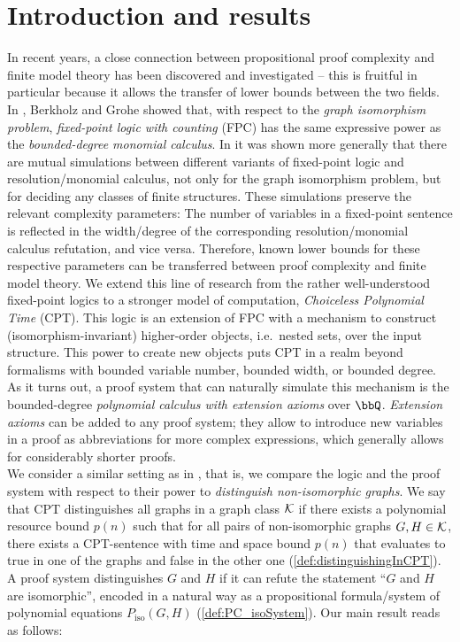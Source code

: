 \documentclass[a4paper,UKenglish,cleveref, autoref, thm-restate]{lipics-v2021}
\newcommand{\Kk}{{\cal K}}
\newcommand{\Piso}{P_{\text{iso}}}
\begin{document}
	\section{Introduction and results}
	In recent years, a close connection between propositional proof complexity and finite model theory has been discovered and investigated -- this is fruitful in particular because it allows the transfer of lower bounds between the two fields. 
	In \cite{berkholz}, Berkholz and Grohe showed that, with respect to the \emph{graph isomorphism problem}, \emph{fixed-point logic with counting} (FPC) has the same expressive power as the \emph{bounded-degree monomial calculus}. In \cite{ggpp} it was shown more generally that there are mutual simulations between different variants of fixed-point logic and resolution/monomial calculus, not only for the graph isomorphism problem, but for deciding any classes of finite structures. These simulations preserve the relevant complexity parameters: The number of variables in a fixed-point sentence is reflected in the width/degree of the corresponding resolution/monomial calculus refutation, and vice versa. Therefore, known lower bounds for these respective parameters can be transferred between proof complexity and finite model theory. We extend this line of research from the rather well-understood fixed-point logics to a stronger model of computation, \emph{Choiceless Polynomial Time} (CPT). This logic is an extension of FPC with a mechanism to construct (isomorphism-invariant) higher-order objects, i.e.\ nested sets, over the input structure. This power to create new objects puts CPT in a realm beyond formalisms with bounded variable number, bounded width, or bounded degree. As it turns out, a proof system that can naturally simulate this mechanism is the bounded-degree \emph{polynomial calculus with extension axioms} over $\bbQ$. \emph{Extension axioms} can be added to any proof system; they allow to introduce new variables in a proof as abbreviations for more complex expressions, which generally allows for considerably shorter proofs.\\
	We consider a similar setting as in \cite{berkholz}, that is, we compare the logic and the proof system with respect to their power to \emph{distinguish non-isomorphic graphs}. We say that CPT distinguishes all graphs in a graph class $\Kk$ if there exists a polynomial resource bound $p(n)$ such that for all pairs of non-isomorphic graphs $G,H \in \Kk$, there exists a CPT-sentence with time and space bound $p(n)$ that evaluates to true in one of the graphs and false in the other one (\autoref{def:distinguishingInCPT}). A proof system distinguishes $G$ and $H$ if it can refute the statement ``$G$ and $H$ are isomorphic'', encoded in a natural way as a propositional formula/system of polynomial equations $\Piso(G,H)$ (\autoref{def:PC_isoSystem}). Our main result reads as follows:
\end{document}
